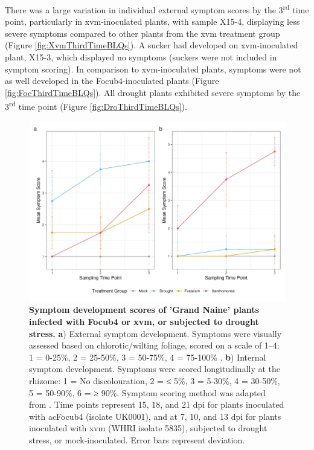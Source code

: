 There was a large variation in individual external symptom scores by the 3\textsuperscript{rd} time point, particularly in \ac{xvm}-inoculated plants, with sample X15-4, displaying less severe symptoms compared to other plants from the \ac{xvm} treatment group (Figure \ref{fig:XvmThirdTimeBLQs}). A sucker had developed on \ac{xvm}-inoculated plant, X15-3, which displayed no symptoms (suckers were not included in symptom scoring). In comparison to \ac{xvm}-inoculated plants, symptoms were not as well developed in the \ac{Focub4}-inoculated plants (Figure \ref{fig:FocThirdTimeBLQs}). All drought plants exhibited severe symptoms by the 3\textsuperscript{rd} time point (Figure \ref{fig:DroThirdTimeBLQs}).

\begin{figure}[b!]
  \centering
  \includegraphics[width=\textwidth]{Figures/Combined_Sympotoms_plot.png}
  \caption[Symptom development scores of 'Grand Naine' plants infected with \acl{Focub4} or \acl{xvm}, or subjected to drought stress.]{\textbf{Symptom development scores of 'Grand Naine' plants infected with \acf{Focub4} or \acf{xvm}, or subjected to drought stress.} \textbf{a}) External symptom development. Symptoms were visually assessed based on chlorotic/wilting foliage, scored on a scale of 1–4: 1 = 0-25\%, 2 = 25-50\%, 3 = 50-75\%, 4 = 75-100\% . \textbf{b}) Internal symptom development. Symptoms were scored longitudinally at the rhizome: 1 = No discolouration, 2 = ≤ 5\%, 3 = 5-30\%, 4 = 30-50\%, 5 = 50-90\%, 6 = ≥ 90\%. Symptom scoring method was adapted from \textcite{Garcia-Bastidas2019}. Time points represent 15, 18, and 21 \ac{dpi} for plants inoculated with ac{Focub4} (isolate UK0001), and at 7, 10, and 13 \ac{dpi} for plants inoculated with \ac{xvm} (WHRI isolate 5835), subjected to drought stress, or mock-inoculated. Error bars represent deviation.}
  \label{fig:SymptomDev}
\end{figure}



